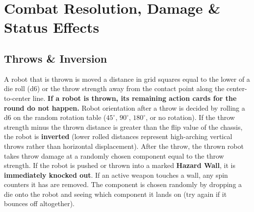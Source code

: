 \documentclass[11pt,a4paper]{article}
\begin{document}
\clearpage


\section{Combat Resolution, Damage \& Status Effects}

\subsection{Throws \& Inversion}

A robot that is thrown is moved a distance in grid squares equal to the lower of a die roll (d6) or the throw strength away from the contact point along the center-to-center line. \textbf{If a robot is thrown, its remaining action cards for the round do not happen.}
Robot orientation after a throw is decided by rolling a d6 on the random rotation table ($45^\circ$, $90^\circ$, $180^\circ$, or no rotation).
If the throw strength minus the thrown distance is greater than the flip value of the chassis, the robot is \textbf{inverted} (lower rolled distances represent high-arching vertical throws rather than horizontal displacement).
After the throw, the thrown robot takes throw damage at a randomly chosen component equal to the throw strength.
If the robot is pushed or thrown into a marked \textbf{Hazard Wall}, it is \textbf{immediately knocked out}.
If an active weapon touches a wall, any spin counters it has are removed.
The component is chosen randomly by dropping a die onto the robot and seeing which component it lands on (try again if it bounces off altogether).
\end{document}
